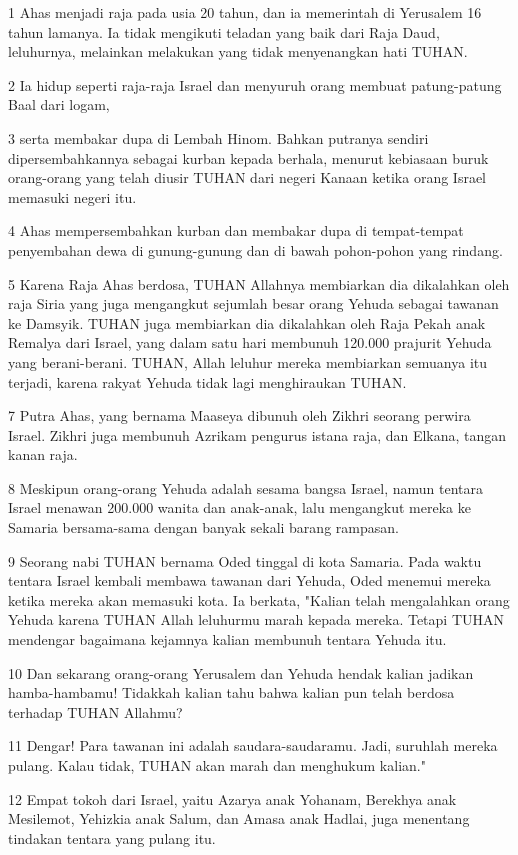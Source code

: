 \par 1 Ahas menjadi raja pada usia 20 tahun, dan ia memerintah di Yerusalem 16 tahun lamanya. Ia tidak mengikuti teladan yang baik dari Raja Daud, leluhurnya, melainkan melakukan yang tidak menyenangkan hati TUHAN.
\par 2 Ia hidup seperti raja-raja Israel dan menyuruh orang membuat patung-patung Baal dari logam,
\par 3 serta membakar dupa di Lembah Hinom. Bahkan putranya sendiri dipersembahkannya sebagai kurban kepada berhala, menurut kebiasaan buruk orang-orang yang telah diusir TUHAN dari negeri Kanaan ketika orang Israel memasuki negeri itu.
\par 4 Ahas mempersembahkan kurban dan membakar dupa di tempat-tempat penyembahan dewa di gunung-gunung dan di bawah pohon-pohon yang rindang.
\par 5 Karena Raja Ahas berdosa, TUHAN Allahnya membiarkan dia dikalahkan oleh raja Siria yang juga mengangkut sejumlah besar orang Yehuda sebagai tawanan ke Damsyik. TUHAN juga membiarkan dia dikalahkan oleh Raja Pekah anak Remalya dari Israel, yang dalam satu hari membunuh 120.000 prajurit Yehuda yang berani-berani. TUHAN, Allah leluhur mereka membiarkan semuanya itu terjadi, karena rakyat Yehuda tidak lagi menghiraukan TUHAN.
\par 7 Putra Ahas, yang bernama Maaseya dibunuh oleh Zikhri seorang perwira Israel. Zikhri juga membunuh Azrikam pengurus istana raja, dan Elkana, tangan kanan raja.
\par 8 Meskipun orang-orang Yehuda adalah sesama bangsa Israel, namun tentara Israel menawan 200.000 wanita dan anak-anak, lalu mengangkut mereka ke Samaria bersama-sama dengan banyak sekali barang rampasan.
\par 9 Seorang nabi TUHAN bernama Oded tinggal di kota Samaria. Pada waktu tentara Israel kembali membawa tawanan dari Yehuda, Oded menemui mereka ketika mereka akan memasuki kota. Ia berkata, "Kalian telah mengalahkan orang Yehuda karena TUHAN Allah leluhurmu marah kepada mereka. Tetapi TUHAN mendengar bagaimana kejamnya kalian membunuh tentara Yehuda itu.
\par 10 Dan sekarang orang-orang Yerusalem dan Yehuda hendak kalian jadikan hamba-hambamu! Tidakkah kalian tahu bahwa kalian pun telah berdosa terhadap TUHAN Allahmu?
\par 11 Dengar! Para tawanan ini adalah saudara-saudaramu. Jadi, suruhlah mereka pulang. Kalau tidak, TUHAN akan marah dan menghukum kalian."
\par 12 Empat tokoh dari Israel, yaitu Azarya anak Yohanam, Berekhya anak Mesilemot, Yehizkia anak Salum, dan Amasa anak Hadlai, juga menentang tindakan tentara yang pulang itu.
